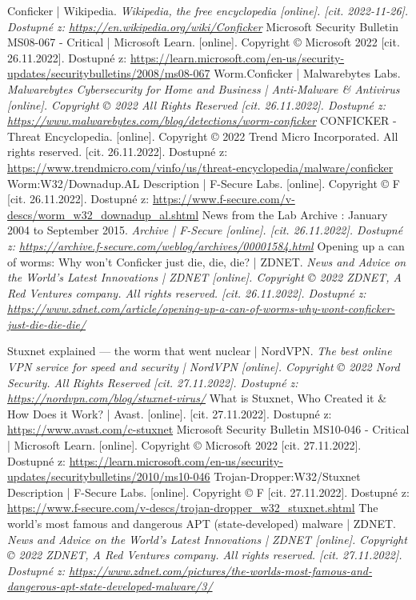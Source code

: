 \documentclass[a4paper,12pt]{article}
\begin{document}
{	
	{
		Conficker | Wikipedia.
		\it{Wikipedia, the free encyclopedia} [online]. [cit. 2022-11-26].
		Dostupné z: \url{https://en.wikipedia.org/wiki/Conficker}
	}	
	{
		Microsoft Security Bulletin MS08-067 - Critical | Microsoft Learn.
		[online]. Copyright © Microsoft 2022 [cit. 26.11.2022].
		Dostupné z: \url{https://learn.microsoft.com/en-us/security-updates/securitybulletins/2008/ms08-067}
	}
	{
		Worm.Conficker | Malwarebytes Labs.
		\it{Malwarebytes Cybersecurity for Home and Business | Anti-Malware \& Antivirus}
		[online]. Copyright © 2022 All Rights Reserved [cit. 26.11.2022].
		Dostupné z: \url{https://www.malwarebytes.com/blog/detections/worm-conficker}
	}
	{
		CONFICKER - Threat Encyclopedia.
		[online]. Copyright © 2022 Trend Micro Incorporated. All rights reserved. [cit. 26.11.2022].
		Dostupné z: \url{https://www.trendmicro.com/vinfo/us/threat-encyclopedia/malware/conficker}
	}
	{
		Worm:W32/Downadup.AL Description | F-Secure Labs.
		[online]. Copyright © F [cit. 26.11.2022].
		Dostupné z: \url{https://www.f-secure.com/v-descs/worm_w32_downadup_al.shtml}
	}
	{
		News from the Lab Archive : January 2004 to September 2015.
		\it{Archive | F-Secure} [online]. [cit. 26.11.2022].
		Dostupné z: \url{https://archive.f-secure.com/weblog/archives/00001584.html}
	}
	{
		Opening up a can of worms: Why won't Conficker just die, die, die? | ZDNET.
		\it{News and Advice on the World's Latest Innovations | ZDNET}
		[online]. Copyright © 2022 ZDNET, A Red Ventures company. All rights reserved. [cit. 26.11.2022].
		Dostupné z: \url{https://www.zdnet.com/article/opening-up-a-can-of-worms-why-wont-conficker-just-die-die-die/}
	}
	
	{
		Stuxnet explained — the worm that went nuclear | NordVPN. 
		\it{The best online VPN service for speed and security | NordVPN}
		[online]. Copyright © 2022 Nord Security. All Rights Reserved [cit. 27.11.2022]. 
		Dostupné z: \url{https://nordvpn.com/blog/stuxnet-virus/}
	}
	{
		What is Stuxnet, Who Created it \& How Does it Work? | Avast.
		[online]. [cit. 27.11.2022].
		Dostupné z: \url{https://www.avast.com/c-stuxnet}
	}
	{
		Microsoft Security Bulletin MS10-046 - Critical | Microsoft Learn. 
		[online]. Copyright © Microsoft 2022 [cit. 27.11.2022].
		Dostupné z: \url{https://learn.microsoft.com/en-us/security-updates/securitybulletins/2010/ms10-046}
	}
	{
		Trojan-Dropper:W32/Stuxnet Description | F-Secure Labs.
		[online]. Copyright © F [cit. 27.11.2022].
		Dostupné z: \url{https://www.f-secure.com/v-descs/trojan-dropper_w32_stuxnet.shtml}
	}
	{
		The world's most famous and dangerous APT (state-developed) malware | ZDNET.
		\it{News and Advice on the World's Latest Innovations | ZDNET}
		[online]. Copyright © 2022 ZDNET, A Red Ventures company. All rights reserved. [cit. 27.11.2022].
		Dostupné z: \url{https://www.zdnet.com/pictures/the-worlds-most-famous-and-dangerous-apt-state-developed-malware/3/}
	}
	
}
\end{document}
